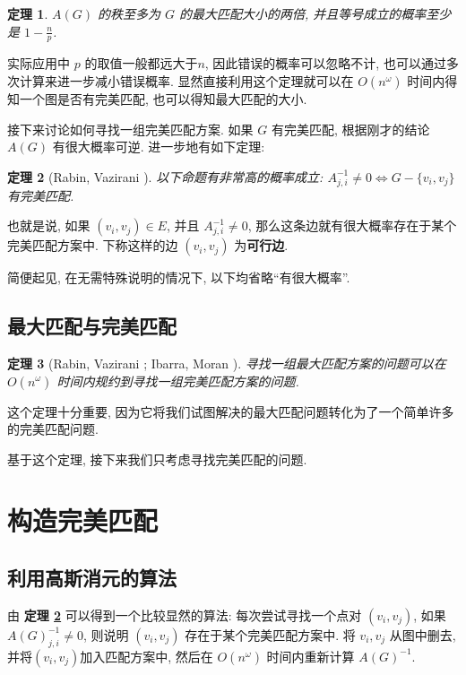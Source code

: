 \documentclass[a4paper]{article}
\newtheorem{theorem}{\hspace{2em}定理}
\begin{document}
			\begin{theorem}
				$A(G)$ 的秩至多为 $G$ 的最大匹配大小的两倍, 并且等号成立的概率至少是 $1 - \frac n p$. 
			\end{theorem}

			实际应用中 $p$ 的取值一般都远大于$n$, 因此错误的概率可以忽略不计, 也可以通过多次计算来进一步减小错误概率. 显然直接利用这个定理就可以在 $O(n^\omega)$ 时间内得知一个图是否有完美匹配, 也可以得知最大匹配的大小.

			接下来讨论如何寻找一组完美匹配方案. 如果 $G$ 有完美匹配, 根据刚才的结论 $A(G)$ 有很大概率可逆. 进一步地有如下定理:

			\begin{theorem}[Rabin, Vazirani \cite{rabin}]
				以下命题有非常高的概率成立: $ A_{j, i} ^{-1} \ne 0 \iff G - \{v_i, v_j\} $ 有完美匹配.
				\label{allowed}
			\end{theorem} 

			也就是说, 如果 $(v_i, v_j) \in E$, 并且 $A_{j,i}^{-1} \ne 0$, 那么这条边就有很大概率存在于某个完美匹配方案中. 下称这样的边 $(v_i, v_j)$ 为\textbf{可行边}.
			
			简便起见, 在无需特殊说明的情况下, 以下均省略``有很大概率''.

		\subsection{最大匹配与完美匹配}
			
			\begin{theorem}[Rabin, Vazirani \cite{rabin} ; Ibarra, Moran \cite{ibarra}]
				寻找一组最大匹配方案的问题可以在 $O(n^\omega)$ 时间内规约到寻找一组完美匹配方案的问题.
				\label{maximum}
			\end{theorem}

			这个定理十分重要, 因为它将我们试图解决的最大匹配问题转化为了一个简单许多的完美匹配问题.

			基于这个定理, 接下来我们只考虑寻找完美匹配的问题.

	\section{构造完美匹配}

		\subsection{利用高斯消元的算法}
				
			\hspace{2em}由 {\bfseries 定理 \ref{allowed}} 可以得到一个比较显然的算法: 每次尝试寻找一个点对 $(v_i, v_j)$, 如果 $A(G)^{-1}_{j, i} \ne 0$, 则说明 $(v_i, v_j)$ 存在于某个完美匹配方案中. 将 $v_i, v_j$ 从图中删去, 并将$(v_i, v_j)$加入匹配方案中, 然后在 $O(n^\omega)$ 时间内重新计算 $A(G)^{-1}$.
\end{document}
